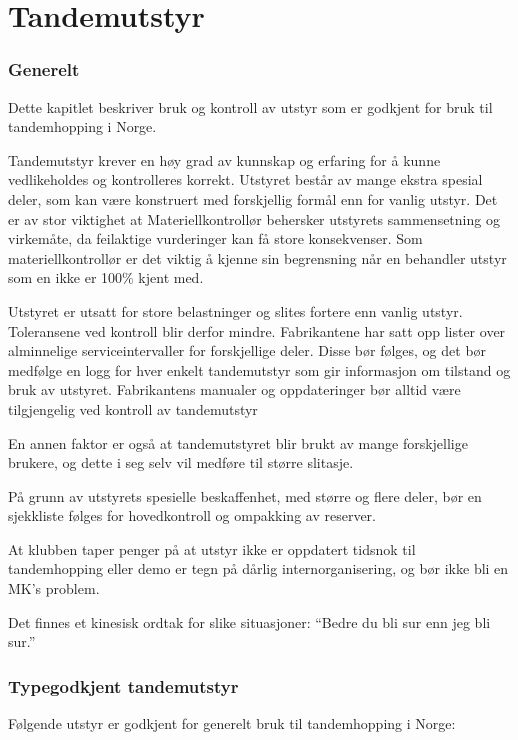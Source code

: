 \part{Tandemutstyr}

\section{Generelt}
Dette kapitlet beskriver bruk og kontroll av utstyr som er godkjent for bruk til tandemhopping i Norge.

Tandemutstyr krever en høy grad av kunnskap og erfaring for å kunne vedlikeholdes og kontrolleres korrekt. Utstyret består av mange ekstra spesial deler, som kan være konstruert med forskjellig formål enn for vanlig utstyr. Det er av stor viktighet at Materiellkontrollør behersker utstyrets sammensetning og virkemåte, da feilaktige vurderinger kan få store konsekvenser. Som materiellkontrollør er det viktig å kjenne sin begrensning når en behandler utstyr som en ikke er 100\% kjent med.

Utstyret er utsatt for store belastninger og slites fortere enn vanlig utstyr. Toleransene ved kontroll blir derfor mindre. Fabrikantene har satt opp lister over alminnelige serviceintervaller for forskjellige deler. Disse bør følges, og det bør medfølge en logg for hver enkelt tandemutstyr som gir informasjon om tilstand og bruk av utstyret. Fabrikantens manualer og oppdateringer bør alltid være tilgjengelig ved kontroll av tandemutstyr

En annen faktor er også at tandemutstyret blir brukt av mange forskjellige brukere, og dette i seg selv vil medføre til større slitasje.

På grunn av utstyrets spesielle beskaffenhet, med større og flere deler, bør en sjekkliste følges for hovedkontroll og ompakking av reserver.

At klubben taper penger på at utstyr ikke er oppdatert tidsnok til tandemhopping eller demo er tegn på dårlig internorganisering, og bør ikke bli en MK’s problem.

Det finnes et kinesisk ordtak for slike situasjoner: ``Bedre du bli sur enn jeg bli sur.''

\section{Typegodkjent tandemutstyr}
Følgende utstyr er godkjent for generelt bruk til tandemhopping i Norge:


